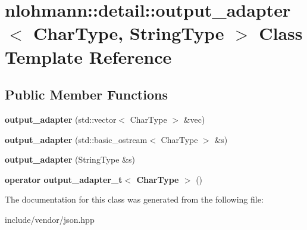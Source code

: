 \hypertarget{classnlohmann_1_1detail_1_1output__adapter}{}\section{nlohmann\+:\+:detail\+:\+:output\+\_\+adapter$<$ Char\+Type, String\+Type $>$ Class Template Reference}
\label{classnlohmann_1_1detail_1_1output__adapter}
\subsection*{Public Member Functions}
\begin{DoxyCompactItemize}
\item 
\mbox{\label{classnlohmann_1_1detail_1_1output__adapter_a05a30a77b568fd84676078d938cbd484}} 
{\bfseries output\+\_\+adapter} (std\+::vector$<$ Char\+Type $>$ \&vec)
\item 
\mbox{\label{classnlohmann_1_1detail_1_1output__adapter_a43b3ba852e6a2c3f4d312543bb04c00d}} 
{\bfseries output\+\_\+adapter} (std\+::basic\+\_\+ostream$<$ Char\+Type $>$ \&s)
\item 
\mbox{\label{classnlohmann_1_1detail_1_1output__adapter_a6ad59d1ec534383b430cd7ef8a518539}} 
{\bfseries output\+\_\+adapter} (String\+Type \&s)
\item 
\mbox{\label{classnlohmann_1_1detail_1_1output__adapter_a5fdac7aec8ade2f4bb0b5df30550d90c}} 
{\bfseries operator output\+\_\+adapter\+\_\+t$<$ Char\+Type $>$} ()
\end{DoxyCompactItemize}


The documentation for this class was generated from the following file\+:\begin{DoxyCompactItemize}
\item 
include/vendor/json.\+hpp\end{DoxyCompactItemize}
